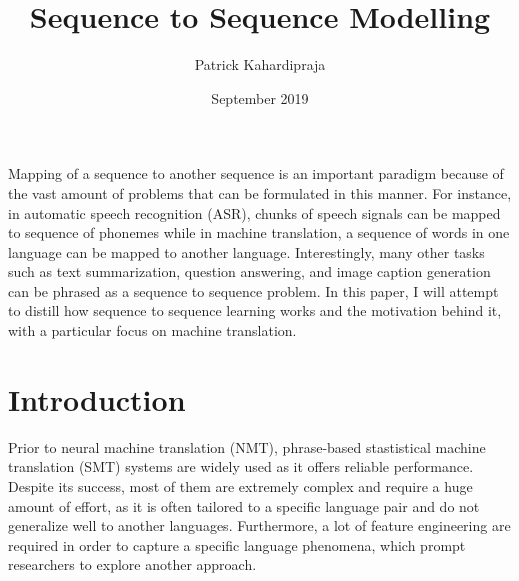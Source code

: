 \documentclass[12pt]{extarticle}
\title{Sequence to Sequence Modelling}
\author{Patrick Kahardipraja}
\date{September 2019}
\begin{document}

\maketitle

Mapping of a sequence to another sequence is an important paradigm because of the vast amount of problems that can be formulated in this manner. For instance, in automatic speech recognition (ASR), chunks of speech signals can be mapped to sequence of phonemes while in machine translation, a sequence of words in one language can be mapped to another language. Interestingly, many other tasks such as text summarization, question answering, and image caption generation can be phrased as a sequence to sequence problem. In this paper, I will attempt to distill how sequence to sequence learning works and the motivation behind it, with a particular focus on machine translation.


\section*{Introduction}


Prior to neural machine translation (NMT), phrase-based stastistical machine translation (SMT) systems are widely used as it offers reliable performance. Despite its success, most of them are extremely complex and require a huge amount of effort, as it is often tailored to a specific language pair and do not generalize well to another languages. Furthermore, a lot of feature engineering are required in order to capture a specific language phenomena, which prompt researchers to explore another approach.
\end{document}
